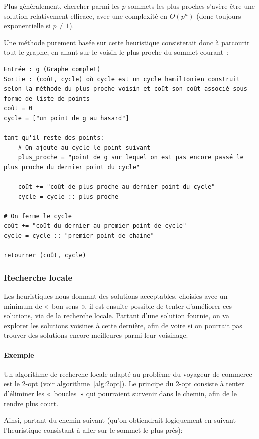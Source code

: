     Plus généralement, chercher parmi les $p$ sommets les plus proches s'avère
    être une solution relativement efficace, avec une complexité en $O(p^n)$
    (donc toujours exponentielle si $p \neq 1$).

    Une méthode purement basée sur cette heuristique consisterait donc à parcourir
    tout le graphe, en allant sur le voisin le plus proche du sommet courant~:

    \begin{lstlisting}
Entrée : g (Graphe complet)
Sortie : (coût, cycle) où cycle est un cycle hamiltonien construit selon la méthode du plus proche voisin et coût son coût associé sous forme de liste de points
coût = 0
cycle = ["un point de g au hasard"]

tant qu'il reste des points:
    # On ajoute au cycle le point suivant
    plus_proche = "point de g sur lequel on est pas encore passé le plus proche du dernier point du cycle"

    coût += "coût de plus_proche au dernier point du cycle"
    cycle = cycle :: plus_proche

# On ferme le cycle
coût += "coût du dernier au premier point de cycle"
cycle = cycle :: "premier point de chaîne"

retourner (coût, cycle)
    \end{lstlisting}

  \subsubsection{Recherche locale}
    Les heuristiques nous donnant des solutions acceptables, choisies avec un
    minimum de «~bon sens~», il est ensuite possible de tenter d'améliorer
    ces solutions, via de la recherche locale.
    Partant d'une solution fournie, on va explorer les solutions voisines
    à cette dernière, afin de voire si on pourrait pas trouver des solutions
    encore meilleures parmi leur voisinage.

    \paragraph{Exemple} Un algorithme de recherche locale adapté au problème
    du voyageur de commerce est le 2-opt (voir algorithme~\ref{alg:2opt}).
    Le principe du 2-opt consiste à tenter d'éliminer les «~boucles~» qui
    pourraient survenir dans le chemin, afin de le rendre plus court.

    Ainsi, partant du chemin suivant (qu'on obtiendrait logiquement en suivant
    l'heuristique consistant à aller sur le sommet le plus près):

